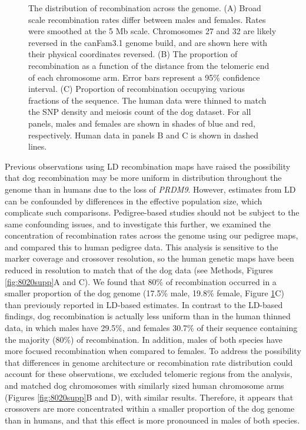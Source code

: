 {\begin{figure}[p]
    \vspace{-15pt}
    \caption{The distribution of recombination across the genome.
        (A) Broad scale recombination rates differ between males and females.  Rates were smoothed at the 5 Mb scale. Chromosomes 27 and 32 are likely reversed in the canFam3.1 genome build, and are shown here with their physical coordinates reversed.
        (B) The proportion of recombination as a function of the distance from the telomeric end of each chromosome arm. Error bars represent a 95\% confidence interval.
        (C) Proportion of recombination occupying various fractions of the sequence. The human data were thinned to match the SNP density and meiosis count of the dog dataset.
        For all panels, males and females are shown in shades of blue and red, respectively. Human data in panels B and C is shown in dashed lines.
    \label{fig:distrRecomb}}
\end{figure}
\clearpage}


Previous observations using LD recombination maps have raised the possibility that dog recombination may be more uniform in distribution throughout the genome than in humans due to the loss of \textit{PRDM9}\cite{Axelsson2012,Auton2013}.
However, estimates from LD can be confounded by differences in the effective population size, which complicate such comparisons.
Pedigree-based studies should not be subject to the same confounding issues, and
to investigate this further, we examined the concentration of recombination rates across the genome using our pedigree maps, and compared this to human pedigree data\cite{Campbell2015}.
This analysis is sensitive to the marker coverage and crossover resolution, so the human genetic maps have been reduced in resolution to match that of the dog data (see Methods, Figures \ref{fig:8020supp}A and C).
We found that 80\% of recombination occurred in a smaller proportion of the dog genome (17.5\% male, 19.8\% female, Figure \ref{fig:distrRecomb}C) than previously reported in LD-based estimates.
In contrast to the LD-based findings, dog recombination is actually less uniform than in the human thinned data,
in which males have 29.5\%, and females 30.7\% of their sequence containing the majority (80\%) of recombination.
In addition, males of both species have more focused recombination when compared to females.
To address the possibility that differences in genome architecture or recombination rate distribution could account for these observations, we excluded telomeric regions from the analysis, and matched dog chromosomes with similarly sized human chromosome arms (Figures \ref{fig:8020supp}B and D), with similar results.
Therefore, it appears that crossovers are more concentrated within a smaller proportion of the dog genome than in humans, and that this effect is more pronounced in males of both species.

